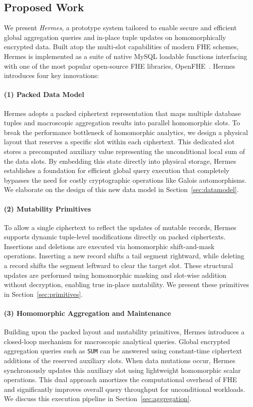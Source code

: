 \documentclass[sigconf,nonacm]{acmart}
\begin{document}
\subsection{Proposed Work}

We present \emph{Hermes}, a prototype system tailored to enable secure and efficient global aggregation queries and in-place tuple updates on homomorphically encrypted data. Built atop the multi-slot capabilities of modern FHE schemes, Hermes is implemented as a suite of native MySQL loadable functions interfacing with one of the most popular open-source FHE libraries, OpenFHE~\cite{openfhe}. Hermes introduces four key innovations:

\paragraph{(1) Packed Data Model}
Hermes adopts a packed ciphertext representation that maps multiple database tuples and macroscopic aggregation results into parallel homomorphic slots. To break the performance bottleneck of homomorphic analytics, we design a physical layout that reserves a specific slot within each ciphertext. This dedicated slot stores a precomputed auxiliary value representing the unconditional local sum of the data slots. By embedding this state directly into physical storage, Hermes establishes a foundation for efficient global query execution that completely bypasses the need for costly cryptographic operations like Galois automorphisms. We elaborate on the design of this new data model in Section~\ref{sec:datamodel}.

\paragraph{(2) Mutability Primitives}
To allow a single ciphertext to reflect the updates of mutable records, Hermes supports dynamic tuple-level modifications directly on packed ciphertexts. Insertions and deletions are executed via homomorphic shift-and-mask operations. Inserting a new record shifts a tail segment rightward, while deleting a record shifts the segment leftward to clear the target slot. These structural updates are performed using homomorphic masking and slot-wise addition without decryption, enabling true in-place mutability. We present these primitives in Section~\ref{sec:primitives}.

\paragraph{(3) Homomorphic Aggregation and Maintenance}
Building upon the packed layout and mutability primitives, Hermes introduces a closed-loop mechanism for macroscopic analytical queries. Global encrypted aggregation queries such as \texttt{SUM} can be answered using constant-time ciphertext additions of the reserved auxiliary slots. When data mutations occur, Hermes synchronously updates this auxiliary slot using lightweight homomorphic scalar operations. This dual approach amortizes the computational overhead of FHE and significantly improves overall query throughput for unconditional workloads. We discuss this execution pipeline in Section~\ref{sec:aggregation}.
\end{document}
